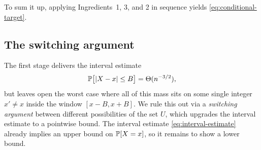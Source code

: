 To sum it up, applying Ingredients~1, 3, and 2 in sequence yields \eqref{eq:conditional-target}.

\subsection{The switching argument}
\label{sec:switching}

The first stage delivers the interval estimate 
\[
\mathbb{P}\bigl[|X - x| \leq B\bigr] = \Theta(n^{-3/2}),
\]
but leaves open the worst case where all of this mass sits on some single integer $x' \ne x$ inside the window $[x - B, x + B]$. We rule this out via a \textit{switching argument} between different possibilities of the set $U$, which upgrades the interval estimate to a pointwise bound. The interval estimate \eqref{eq:interval-estimate} already implies an upper bound on $\mathbb{P}[X = x]$, so it remains to show a lower bound.


